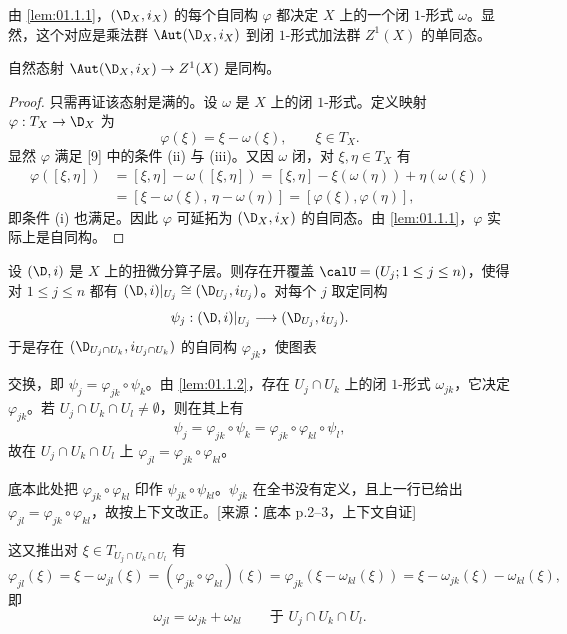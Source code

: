 由 \ref{lem:01.1.1}，$(\D_X,i_X)$ 的每个自同构 $\varphi$ 都决定 $X$ 上的一个闭 $1$-形式 $\omega$。显然，这个对应是乘法群 $\Aut(\D_X,i_X)$ 到闭 $1$-形式加法群 $Z^1(X)$ 的单同态。

\begin{lemma}\label{lem:01.1.2}
自然态射 $\Aut(\D_X,i_X)\to Z^1(X)$ 是同构。
\end{lemma}

\begin{proof}
只需再证该态射是满的。设 $\omega$ 是 $X$ 上的闭 $1$-形式。定义映射 $\varphi:T_X\to\D_X$ 为
$$\varphi(\xi)=\xi-\omega(\xi),\qquad \xi\in T_X.$$
显然 $\varphi$ 满足 [9] 中的条件 (ii) 与 (iii)。又因 $\omega$ 闭，对 $\xi,\eta\in T_X$ 有
\begin{align*}
\varphi([\xi,\eta])&=[\xi,\eta]-\omega([\xi,\eta])=[\xi,\eta]-\xi(\omega(\eta))+\eta(\omega(\xi))\\
&=[\xi-\omega(\xi),\,\eta-\omega(\eta)]=[\varphi(\xi),\varphi(\eta)],
\end{align*}
即条件 (i) 也满足。因此 $\varphi$ 可延拓为 $(\D_X,i_X)$ 的自同态。由 \ref{lem:01.1.1}，$\varphi$ 实际上是自同构。
\end{proof}

设 $(\D,i)$ 是 $X$ 上的扭微分算子层。则存在开覆盖 $\calU=(U_j;1\le j\le n)$，使得对 $1\le j\le n$ 都有 $(\D,i)|_{U_j}\cong(\D_{U_j},i_{U_j})$。对每个 $j$ 取定同构
$$\psi_j:(\D,i)|_{U_j}\longrightarrow(\D_{U_j},i_{U_j}).$$
于是存在 $(\D_{U_j\cap U_k},i_{U_j\cap U_k})$ 的自同构 $\varphi_{jk}$，使图表
\begin{center}
\end{center}
交换，即 $\psi_j=\varphi_{jk}\circ\psi_k$。由 \ref{lem:01.1.2}，存在 $U_j\cap U_k$ 上的闭 $1$-形式 $\omega_{jk}$，它决定 $\varphi_{jk}$。若 $U_j\cap U_k\cap U_l\neq\emptyset$，则在其上有
$$\psi_j=\varphi_{jk}\circ\psi_k=\varphi_{jk}\circ\varphi_{kl}\circ\psi_l,$$
故在 $U_j\cap U_k\cap U_l$ 上 $\varphi_{jl}=\varphi_{jk}\circ\varphi_{kl}$。
\begin{annote}
底本此处把 $\varphi_{jk}\circ\varphi_{kl}$ 印作 $\psi_{jk}\circ\psi_{kl}$。$\psi_{jk}$ 在全书没有定义，且上一行已给出 $\varphi_{jl}=\varphi_{jk}\circ\varphi_{kl}$，故按上下文改正。[来源：底本 p.2--3，上下文自证]
\end{annote}
这又推出对 $\xi\in T_{U_j\cap U_k\cap U_l}$ 有
$$\varphi_{jl}(\xi)=\xi-\omega_{jl}(\xi)=(\varphi_{jk}\circ\varphi_{kl})(\xi)=\varphi_{jk}(\xi-\omega_{kl}(\xi))=\xi-\omega_{jk}(\xi)-\omega_{kl}(\xi),$$
即
$$\omega_{jl}=\omega_{jk}+\omega_{kl}\qquad\text{于 } U_j\cap U_k\cap U_l.$$

